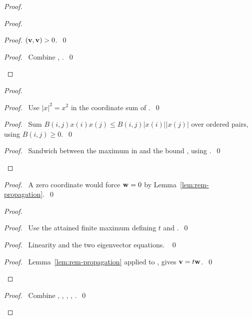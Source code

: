 \begin{proof}
\begin{proof}
\begin{proof}
$({\mathbf v},{\mathbf v})>0$.~\qed\end{proof}
\qedstep
\begin{proof}\pf\ Combine , .~\qed\end{proof}
\end{proof}
\begin{proof}
\begin{proof}\pf\ Use $|x|^2=x^2$ in the coordinate sum of
.~\qed\end{proof}
\begin{proof}\pf\ Sum $B(i,j)x(i)x(j)\leq B(i,j)|x(i)||x(j)|$
over ordered pairs, using $B(i,j)\geq0$.~\qed\end{proof}
\qedstep
\begin{proof}\pf\ Sandwich  between the maximum in
 and the bound , using .~\qed\end{proof}
\end{proof}
\begin{proof}\pf\ A zero coordinate would force ${\mathbf w}=0$ by
Lemma~\ref{lem:rem-propagation}.~\qed\end{proof}
\begin{proof}
\begin{proof}\pf\ Use the attained finite maximum defining $t$ and
.~\qed\end{proof}
\begin{proof}\pf\ Linearity and the two eigenvector equations. ~\qed\end{proof}
\qedstep
\begin{proof}\pf\ Lemma~\ref{lem:rem-propagation} applied to
,  gives ${\mathbf v}=t{\mathbf w}$.~\qed\end{proof}
\end{proof}
\qedstep
\begin{proof}\pf\ Combine , ,
, , .~\qed\end{proof}
\end{proof}

